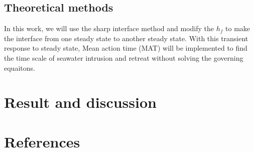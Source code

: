 \documentclass[review]{elsarticle}
\begin{document}
\subsection{Theoretical methods}
In this work, we will use the sharp interface method and modify the $h_f$ to make the interface from one steady state to another steady state. With this transient response to steady state, Mean action time (MAT) \cite{simpson2013long} will be implemented to find the time scale of seawater intrusion and retreat without solving the governing equaitons. 












 

\section{Result and discussion}


\section*{References}


\end{document}
